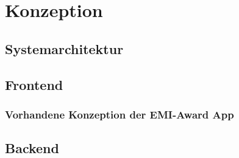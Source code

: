 \chapter{Konzeption}
\section{Systemarchitektur}
\section{Frontend}
\subsection{Vorhandene Konzeption der EMI-Award App}
\section{Backend}